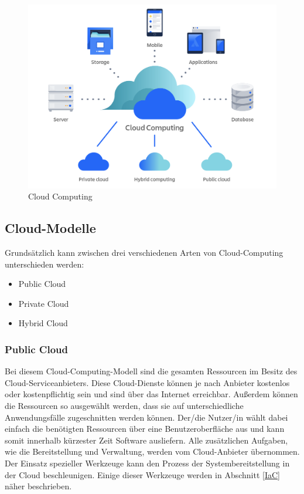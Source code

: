     \begin{figure}[H]
        \centering
        \includegraphics[width=0.75\linewidth]{images/EA/cloud-computing.png}
        \caption{Cloud Computing \\ \cite{EA:Web55}}
        \label{fig:cloud-computing}
    \end{figure}


    
    \subsection{Cloud-Modelle} \label{Cloud-Modelle}

        Grundsätzlich kann zwischen drei verschiedenen Arten von Cloud-Computing unterschieden werden:
        \begin{itemize}
            \item Public Cloud
            \item Private Cloud
            \item Hybrid Cloud
        \end{itemize}

    
    
        \subsubsection{Public Cloud}
    
        Bei diesem Cloud-Computing-Modell sind die gesamten Ressourcen im Besitz des Cloud-Serviceanbieters. 
        Diese Cloud-Dienste können je nach Anbieter kostenlos oder kostenpflichtig sein und sind über das Internet erreichbar.
        Außerdem können die Ressourcen so ausgewählt werden, dass sie auf unterschiedliche Anwendungsfälle zugeschnitten werden können. Der/die Nutzer/in 
        wählt dabei einfach die benötigten Ressourcen über eine Benutzeroberfläche aus und kann somit innerhalb kürzester Zeit Software ausliefern. Alle zusätzlichen Aufgaben, wie die Bereitstellung und Verwaltung, werden vom Cloud-Anbieter übernommen. Der Einsatz spezieller Werkzeuge kann den Prozess der Systembereitstellung in der Cloud beschleunigen. Einige dieser Werkzeuge werden in Abschnitt \ref{IaC} näher beschrieben.
        \cite{EA:Web53, EA:Web54}
    
